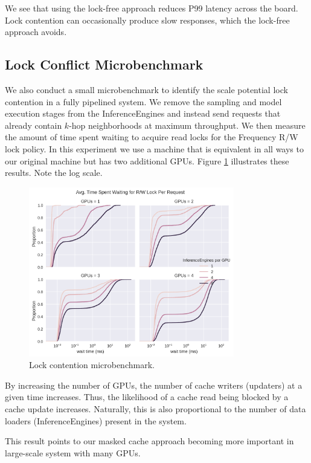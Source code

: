 We see that using the lock-free approach reduces P99 latency across the board. Lock contention can occasionally produce slow responses, which the lock-free approach avoids.

\subsection{Lock Conflict Microbenchmark} \label{Eval: microbenchmark}
We also conduct a small microbenchmark to identify the scale potential lock contention in a fully pipelined system. 
We remove the sampling and model execution stages from the InferenceEngines and instead send requests that already contain $k$-hop neighborhoods at maximum throughput.
We then measure the amount of time spent waiting to acquire read locks for the Frequency R/W lock policy. 
In this experiment we use a machine that is equivalent in all ways to our original machine but has two additional GPUs. Figure \ref{Eval: Lock conflict microbenchmark} illustrates these results. Note the log scale.
\begin{figure}[h!]
    \centering
    \includegraphics[width=0.8\textwidth]{figures/Lock_Conflicts.png}
    
    \caption{Lock contention microbenchmark.}
    \label{Eval: Lock conflict microbenchmark}
\end{figure}    
By increasing the number of GPUs, the number of cache writers (updaters) at a given time increases. Thus, the likelihood of a cache read being blocked by a cache update increases. Naturally, this is also proportional to the number of data loaders (InferenceEngines) present in the system. 

This result points to our masked cache approach becoming more important in large-scale system with many GPUs.

